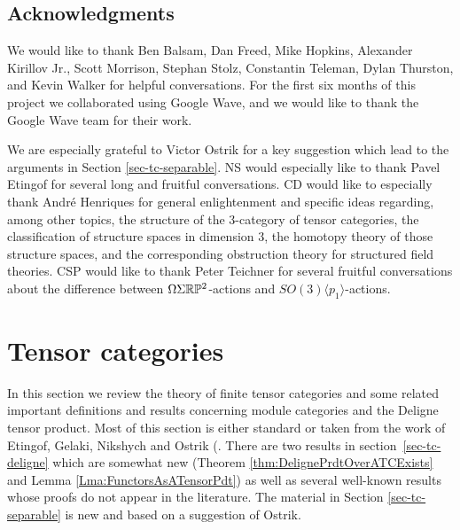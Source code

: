 \documentclass{amsart}
\begin{document}
\subsection*{Acknowledgments}
We would like to thank Ben Balsam, Dan Freed, Mike Hopkins, Alexander Kirillov Jr., Scott Morrison, Stephan Stolz, Constantin Teleman, Dylan Thurston, and Kevin Walker for helpful conversations.   For the first six months of this project we collaborated using Google Wave, and we would like to thank the Google Wave team for their work.  

We are especially grateful to Victor Ostrik for a key suggestion which lead to the arguments in Section \ref{sec-tc-separable}.  NS would especially like to thank Pavel Etingof for several long and fruitful conversations.  CD would like to especially thank Andr\'e Henriques for general enlightenment and specific ideas regarding, among other topics, the structure of the 3-category of tensor categories, the classification of structure spaces in dimension 3,  the homotopy theory of those structure spaces, and the corresponding obstruction theory for structured field theories.
CSP would like to thank Peter Teichner for several fruitful conversations about the difference between $\Omega \Sigma \mathbb R \mathbb P^2$-actions and $SO(3)\langle p_1 \rangle$-actions. 


\section{Tensor categories} \label{sec-tc}

In this section we review the theory of finite tensor categories and some related important definitions and results concerning module categories and the Deligne tensor product.  Most of this section is either standard or taken from the work of Etingof, Gelaki, Nikshych and Ostrik (\cite{MR1976459,MR2183279,MR2097289, 0909.3140, EGNO}.  There are two results in section~\ref{sec-tc-deligne} which are somewhat new (Theorem \ref{thm:DelignePrdtOverATCExists} and Lemma \ref{Lma:FunctorsAsATensorPdt}) as well as several well-known results whose proofs do not appear in the literature. The material in Section \ref{sec-tc-separable} is new and based on a suggestion of Ostrik.

\end{document}
